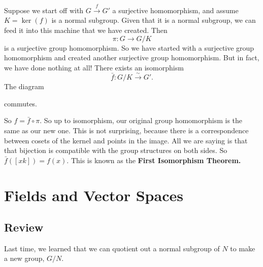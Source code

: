Suppose we start off with $G \xrightarrow{f} G'$ a surjective homomorphism, and assume $K = \ker(f)$ is a normal subgroup. Given that it is a normal subgroup, we can feed it into this machine that we have created. Then 
\[
\pi: G \rightarrow G/K
\]
is a surjective group homomorphism. So we have started with a surjective group homomorphism and created another surjective group homomorphism. But in fact, we have done nothing at all! There exists an isomorphism 
\[
\bar{f}: G/K \xrightarrow{\sim} G' .
\]
The diagram 

\begin{center}

\end{center}
commutes. 

So $f = \bar{f} \circ \pi.$ So up to isomorphism, our original group homomorphism is the same as our new one. This is not surprising, because there is a correspondence between cosets of the kernel and points in the image. All we are saying is that that bijection is compatible with the group structures on both sides. So $\bar{f}([xk]) = f(x).$ This is known as the \textbf{First Isomorphism Theorem.}

\newpage


\section{Fields and Vector Spaces}
\subsection{Review}
Last time, we learned that we can quotient out a normal subgroup of $N$ to make a new group, $G/N.$

